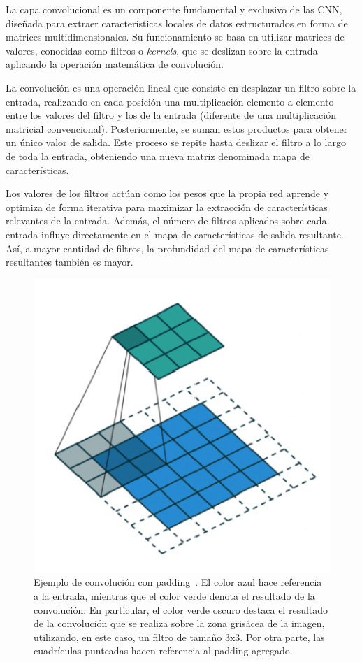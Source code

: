 La capa convolucional es un componente fundamental y exclusivo de las CNN, diseñada para extraer características locales de datos estructurados en forma de matrices multidimensionales. Su funcionamiento se basa en utilizar matrices de valores, conocidas como filtros o \emph{kernels}, que se deslizan sobre la entrada aplicando la operación matemática de convolución.\newline

La convolución es una operación lineal que consiste en desplazar un filtro sobre la entrada, realizando en cada posición una multiplicación elemento a elemento entre los valores del filtro y los de la entrada (diferente de una multiplicación matricial convencional). Posteriormente, se suman estos productos para obtener un único valor de salida. Este proceso se repite hasta deslizar el filtro a lo largo de toda la entrada, obteniendo una nueva matriz denominada mapa de características.\newline

Los valores de los filtros actúan como los pesos que la propia red aprende y optimiza de forma iterativa para maximizar la extracción de características relevantes de la entrada. Además, el número de filtros aplicados sobre cada entrada influye directamente en el mapa de características de salida resultante. Así, a mayor cantidad de filtros, la profundidad del mapa de características resultantes también es mayor.\newline

\begin{figure}[h]
    \centering
    \includegraphics[width=0.5\linewidth]{img/convolucion.png}
    \caption[Ejemplo de convolución con padding~\cite{Saha2018}.]{Ejemplo de convolución con padding~\cite{Saha2018}. El color azul hace referencia a la entrada, mientras que el color verde denota el resultado de la convolución. En particular, el color verde oscuro destaca el resultado de la convolución que se realiza sobre la zona grisácea de la imagen, utilizando, en este caso, un filtro de tamaño 3x3. Por otra parte, las cuadrículas punteadas hacen referencia al padding agregado.}\label{fig:convolucion}
\end{figure}


